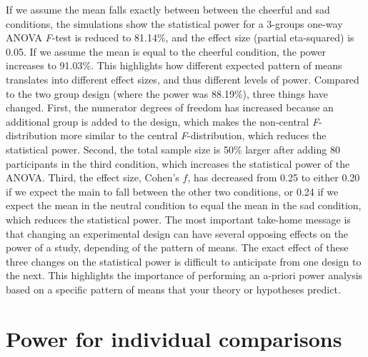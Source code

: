 \documentclass[
  ,jou,floatsintext]{apa6}
\begin{document}
If we assume the mean falls exactly between between the cheerful and sad conditions, the simulations show the statistical power for a 3-groups one-way ANOVA \emph{F}-test is reduced to 81.14\%, and the effect size (partial eta-squared) is 0.05.
If we assume the mean is equal to the cheerful condition, the power increases to 91.03\%.
This highlights how different expected pattern of means translates into different effect sizes, and thus different levels of power.
Compared to the two group design (where the power was 88.19\%), three things have changed.
First, the numerator degrees of freedom has increased because an additional group is added to the design, which makes the non-central \emph{F}-distribution more similar to the central \emph{F}-distribution, which reduces the statistical power.
Second, the total sample size is 50\% larger after adding 80 participants in the third condition, which increases the statistical power of the ANOVA.
Third, the effect size, Cohen's \(f\), has decreased from 0.25 to either 0.20 if we expect the main to fall between the other two conditions, or 0.24 if we expect the mean in the neutral condition to equal the mean in the sad condition, which reduces the statistical power.
The most important take-home message is that changing an experimental design can have several opposing effects on the power of a study, depending of the pattern of means.
The exact effect of these three changes on the statistical power is difficult to anticipate from one design to the next.
This highlights the importance of performing an a-priori power analysis based on a specific pattern of means that your theory or hypotheses predict.

\hypertarget{power-for-individual-comparisons}{%
\section{Power for individual comparisons}\label{power-for-individual-comparisons}}
\end{document}
